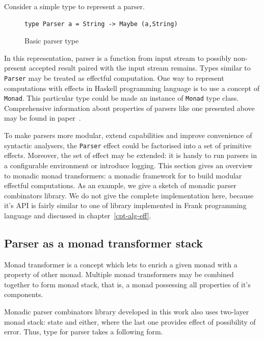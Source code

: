     Consider a simple type to represent a parser.

    \begin{figure}[h]
    \begin{lstlisting}
type Parser a = String -> Maybe (a,String)
    \end{lstlisting}
    \caption{Basic parser type}
    \label{listing:maybeParser}
    \end{figure}

    In this representation, parser is a
    function from input stream to possibly non-present accepted result paired
    with the input stream remains.
    Types similar to \texttt{Parser} may be treated as effectful computation.
    One way to represent computations with effects in Haskell
    programming language is to use a concept of \texttt{Monad}. This particular
    type could be made an instance of \texttt{Monad} type class.
    Comprehensive information about properties of parsers like one presented
    above may be found in paper~\cite{monParsing}.

    To make parsers more modular, extend capabilities and improve convenience of
    syntactic analysers, the \texttt{Parser} effect could be factorised into a set of
    primitive effects. Moreover, the set of effect may be extended: it is handy to
    run parsers in a configurable environment or introduce logging.
    This section gives an overview to monadic monad transformers: a monadic framework
    for to build modular effectful computations. As an example, we give a sketch of
    monadic parser combinators library. We do not give the complete implementation
    here, because it's API is fairly similar to one of library implemented in
    Frank programming language and discussed in chapter~\ref{cpt-alg-eff}.

    \subsection{Parser as a monad transformer stack}

      Monad transformer is a concept which lets to enrich a given monad with a
      property of other monad. Multiple monad transformers may be combined
      together to form monad stack, that is, a monad possessing all properties of
      it's components.

      Monadic parser combinators library developed in this work also uses two-layer monad
      stack: state and either,
      where the last one provides effect of possibility of error. Thus, type for parser
      takes a following form.

